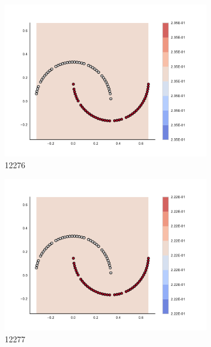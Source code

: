 \begin{figure}[h]
\begin{subfigure}[b]{0.09\textwidth}
    \includegraphics[clip, trim=2.35cm 1.75cm 4.5cm 0cm,width=\textwidth]{img/convergence/12276.pdf}
    \caption{12276}
    \label{fig:convergence_12276}
\end{subfigure}
%
\begin{subfigure}[b]{0.09\textwidth}
    \includegraphics[clip, trim=2.35cm 1.75cm 4.5cm 0cm,width=\textwidth]{img/convergence/12277.pdf}
    \caption{12277}
    \label{fig:convergence_12277}
\end{subfigure}
%
\begin{subfigure}[b]{0.09\textwidth}

\end{subfigure}
\end{figure}
